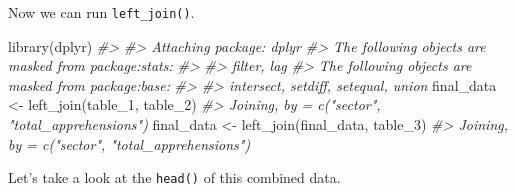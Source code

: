 \documentclass[
]{krantz}
\makeatletter
\newenvironment{Shaded}{\begin{snugshade}}{\end{snugshade}}
\newcommand{\CommentTok}[1]{\textcolor[rgb]{0.37,0.37,0.37}{\textit{#1}}}
\newcommand{\FunctionTok}[1]{\textcolor[rgb]{0,0,0}{#1}}
\newcommand{\NormalTok}[1]{#1}
\newcommand{\OtherTok}[1]{\textcolor[rgb]{0.37,0.37,0.37}{#1}}
\newcommand{\SpecialCharTok}[1]{\textcolor[rgb]{0,0,0}{#1}}
\newcommand{\StringTok}[1]{\textcolor[rgb]{0.5,0.5,0.5}{#1}}
\newenvironment{kframe}{%
\medskip{}
\setlength{\fboxsep}{.8em}
 \def\at@end@of@kframe{}%
 \ifinner\ifhmode%
  \def\at@end@of@kframe{\end{minipage}}%
  \begin{minipage}{\columnwidth}%
 \fi\fi%
 \def\FrameCommand##1{\hskip\@totalleftmargin \hskip-\fboxsep
 \colorbox{shadecolor}{##1}\hskip-\fboxsep
     \hskip-\linewidth \hskip-\@totalleftmargin \hskip\columnwidth}%
 \MakeFramed {\advance\hsize-\width
   \@totalleftmargin\z@ \linewidth\hsize
   \@setminipage}}%
 {\par\unskip\endMakeFramed%
 \at@end@of@kframe}
\renewenvironment{Shaded}{\begin{kframe}}{\end{kframe}}
\makeatother
\begin{document}
\begin{Shaded}
\end{Shaded}

Now we can run \texttt{left\_join()}.

\begin{Shaded}
\begin{Highlighting}[]
\FunctionTok{library}\NormalTok{(dplyr)}
\CommentTok{\#\textgreater{} }
\CommentTok{\#\textgreater{} Attaching package: \textquotesingle{}dplyr\textquotesingle{}}
\CommentTok{\#\textgreater{} The following objects are masked from \textquotesingle{}package:stats\textquotesingle{}:}
\CommentTok{\#\textgreater{} }
\CommentTok{\#\textgreater{}     filter, lag}
\CommentTok{\#\textgreater{} The following objects are masked from \textquotesingle{}package:base\textquotesingle{}:}
\CommentTok{\#\textgreater{} }
\CommentTok{\#\textgreater{}     intersect, setdiff, setequal, union}
\NormalTok{final\_data }\OtherTok{\textless{}{-}} \FunctionTok{left\_join}\NormalTok{(table\_1, table\_2)}
\CommentTok{\#\textgreater{} Joining, by = c("sector", "total\_apprehensions")}
\NormalTok{final\_data }\OtherTok{\textless{}{-}} \FunctionTok{left\_join}\NormalTok{(final\_data, table\_3)}
\CommentTok{\#\textgreater{} Joining, by = c("sector", "total\_apprehensions")}
\end{Highlighting}
\end{Shaded}

Let's take a look at the \texttt{head()} of this combined data.
\end{document}
